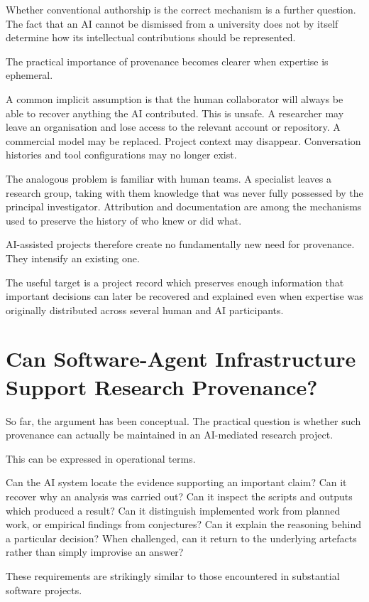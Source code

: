 Whether conventional authorship is the correct mechanism is a further question. The fact that an AI cannot be dismissed from a university does not by itself determine how its intellectual contributions should be represented.

The practical importance of provenance becomes clearer when expertise is ephemeral.

A common implicit assumption is that the human collaborator will always be able to recover anything the AI contributed. This is unsafe. A researcher may leave an organisation and lose access to the relevant account or repository. A commercial model may be replaced. Project context may disappear. Conversation histories and tool configurations may no longer exist.

The analogous problem is familiar with human teams. A specialist leaves a research group, taking with them knowledge that was never fully possessed by the principal investigator. Attribution and documentation are among the mechanisms used to preserve the history of who knew or did what.

AI-assisted projects therefore create no fundamentally new need for provenance. They intensify an existing one.

The useful target is a project record which preserves enough information that important decisions can later be recovered and explained even when expertise was originally distributed across several human and AI participants.


\section{Can Software-Agent Infrastructure Support Research Provenance?}

So far, the argument has been conceptual. The practical question is whether such provenance can actually be maintained in an AI-mediated research project.

This can be expressed in operational terms.

Can the AI system locate the evidence supporting an important claim? Can it recover why an analysis was carried out? Can it inspect the scripts and outputs which produced a result? Can it distinguish implemented work from planned work, or empirical findings from conjectures? Can it explain the reasoning behind a particular decision? When challenged, can it return to the underlying artefacts rather than simply improvise an answer?

These requirements are strikingly similar to those encountered in substantial software projects.


